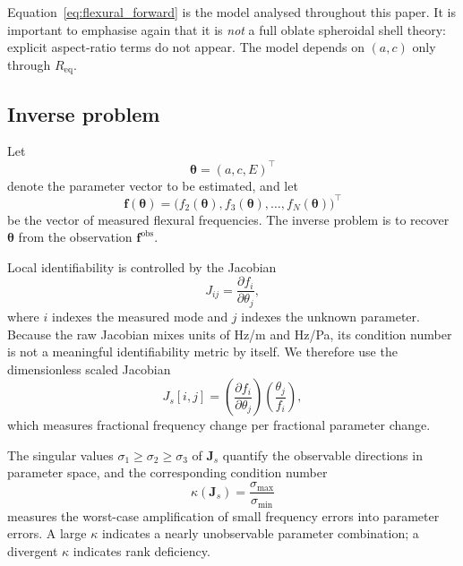Equation~\eqref{eq:flexural_forward} is the model analysed throughout this
paper.  It is important to emphasise again that it is \emph{not} a full oblate
spheroidal shell theory: explicit aspect-ratio terms do not appear.  The model
depends on $(a,c)$ only through $R_\mathrm{eq}$.

\subsection{Inverse problem}

Let
\begin{equation}
  \boldsymbol{\theta} = (a,c,E)^\top
\end{equation}
denote the parameter vector to be estimated, and let
\begin{equation}
  \mathbf{f}(\boldsymbol{\theta})
  =
  \bigl(f_2(\boldsymbol{\theta}),
        f_3(\boldsymbol{\theta}),
        \ldots,
        f_N(\boldsymbol{\theta})\bigr)^\top
\end{equation}
be the vector of measured flexural frequencies.  The inverse problem is to
recover $\boldsymbol{\theta}$ from the observation
$\mathbf{f}^\mathrm{obs}$.

Local identifiability is controlled by the Jacobian
\begin{equation}\label{eq:jacobian_raw}
  J_{ij}
  =
  \frac{\partial f_i}{\partial \theta_j},
\end{equation}
where $i$ indexes the measured mode and $j$ indexes the unknown parameter.
Because the raw Jacobian mixes units of \si{Hz/m} and \si{Hz/Pa}, its condition
number is not a meaningful identifiability metric by itself.  We therefore use
the dimensionless scaled Jacobian
\begin{equation}\label{eq:jacobian_scaled}
  J_s[i,j]
  =
  \left(\frac{\partial f_i}{\partial \theta_j}\right)
  \left(\frac{\theta_j}{f_i}\right),
\end{equation}
which measures fractional frequency change per fractional parameter change.

The singular values $\sigma_1 \ge \sigma_2 \ge \sigma_3$ of $\mathbf{J}_s$
quantify the observable directions in parameter space, and the corresponding
condition number
\begin{equation}\label{eq:kappa}
  \kappa(\mathbf{J}_s)
  =
  \frac{\sigma_{\max}}{\sigma_{\min}}
\end{equation}
measures the worst-case amplification of small frequency errors into parameter
errors.  A large $\kappa$ indicates a nearly unobservable parameter
combination; a divergent $\kappa$ indicates rank deficiency.

